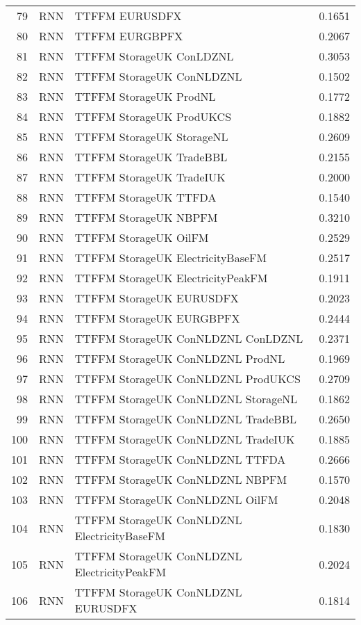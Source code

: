 \begin{table}[ht]
\begin{tabular}{rllr}
  79 & RNN & TTFFM EURUSDFX & 0.1651 \\ 
  80 & RNN & TTFFM EURGBPFX & 0.2067 \\ 
  81 & RNN & TTFFM StorageUK ConLDZNL & 0.3053 \\ 
  82 & RNN & TTFFM StorageUK ConNLDZNL & 0.1502 \\ 
  83 & RNN & TTFFM StorageUK ProdNL & 0.1772 \\ 
  84 & RNN & TTFFM StorageUK ProdUKCS & 0.1882 \\ 
  85 & RNN & TTFFM StorageUK StorageNL & 0.2609 \\ 
  86 & RNN & TTFFM StorageUK TradeBBL & 0.2155 \\ 
  87 & RNN & TTFFM StorageUK TradeIUK & 0.2000 \\ 
  88 & RNN & TTFFM StorageUK TTFDA & 0.1540 \\ 
  89 & RNN & TTFFM StorageUK NBPFM & 0.3210 \\ 
  90 & RNN & TTFFM StorageUK OilFM & 0.2529 \\ 
  91 & RNN & TTFFM StorageUK ElectricityBaseFM & 0.2517 \\ 
  92 & RNN & TTFFM StorageUK ElectricityPeakFM & 0.1911 \\ 
  93 & RNN & TTFFM StorageUK EURUSDFX & 0.2023 \\ 
  94 & RNN & TTFFM StorageUK EURGBPFX & 0.2444 \\ 
  95 & RNN & TTFFM StorageUK ConNLDZNL ConLDZNL & 0.2371 \\ 
  96 & RNN & TTFFM StorageUK ConNLDZNL ProdNL & 0.1969 \\ 
  97 & RNN & TTFFM StorageUK ConNLDZNL ProdUKCS & 0.2709 \\ 
  98 & RNN & TTFFM StorageUK ConNLDZNL StorageNL & 0.1862 \\ 
  99 & RNN & TTFFM StorageUK ConNLDZNL TradeBBL & 0.2650 \\ 
  100 & RNN & TTFFM StorageUK ConNLDZNL TradeIUK & 0.1885 \\ 
  101 & RNN & TTFFM StorageUK ConNLDZNL TTFDA & 0.2666 \\ 
  102 & RNN & TTFFM StorageUK ConNLDZNL NBPFM & 0.1570 \\ 
  103 & RNN & TTFFM StorageUK ConNLDZNL OilFM & 0.2048 \\ 
  104 & RNN & TTFFM StorageUK ConNLDZNL ElectricityBaseFM & 0.1830 \\ 
  105 & RNN & TTFFM StorageUK ConNLDZNL ElectricityPeakFM & 0.2024 \\ 
  106 & RNN & TTFFM StorageUK ConNLDZNL EURUSDFX & 0.1814 \\ 

\end{tabular}
\end{table}

